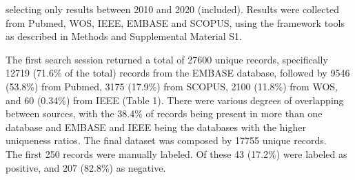 \documentclass{article}
\begin{document}
selecting only results between 2010 and 2020 (included). Results were
collected from Pubmed, WOS, IEEE, EMBASE and SCOPUS, using the framework
tools as described in Methods and Supplemental Material S1.

The first search session returned a total of 27600 unique records,
specifically 12719 (71.6\% of the total) records from the EMBASE
database, followed by 9546 (53.8\%) from Pubmed, 3175 (17.9\%) from
SCOPUS, 2100 (11.8\%) from WOS, and 60 (0.34\%) from IEEE (Table 1).
There were various degrees of overlapping between sources, with the
38.4\% of records being present in more than one database and EMBASE and
IEEE being the databases with the higher uniqueness ratios. The final
dataset was composed by 17755 unique records.\\
The first 250 records were manually labeled. Of these 43 (17.2\%) were
labeled as positive, and 207 (82.8\%) as negative.
\end{document}
